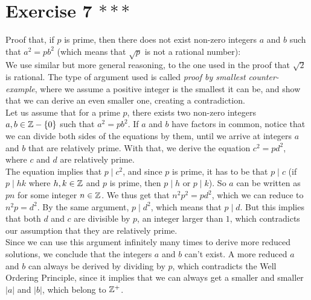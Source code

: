 \documentclass[12pt]{article}
\begin{document}
    \section*{Exercise 7  $***$}
    Proof that, if $p$ is prime, 
    then there does not exist non-zero integers $a$ and $b$
    such that $a^2 = pb^2$
    (which means that $\sqrt{p}$ is not a rational number): \\
    We use similar but more general reasoning,
    to the one used in the proof that $\sqrt{2}$ is rational.
    The type of argument used is called
    \textit{proof by smallest counter-example},
    where we assume a positive integer is the smallest it can be,
    and show that we can derive an even smaller one,
    creating a contradiction. \\
    Let us assume that for a prime $p$,
    there exists two non-zero integers $a, b \in \mathbb{Z} - \{0\}$ 
    such that $a^2 = pb^2$.
    If $a$ and $b$ have factors in common,
    notice that we can divide both sides of the equations by them,
    until we arrive at integers $a$ and $b$ that are relatively prime.
    With that, we derive the equation $c^2 = pd^2$,
    where $c$ and $d$ are relatively prime. \\
    The equation implies that $p \mid c^2$,
    and since $p$ is prime, 
    it has to be that $p \mid c$
    (if $p \mid hk$ where $h, k \in \mathbb{Z}$ and $p$ is prime,
    then $p \mid h$ or $p \mid k$).
    So $a$ can be written as $pn$ for some integer $n \in \mathbb{Z}$.
    We thus get that $n^2p^2 = pd^2$,
    which we can reduce to $n^2p = d^2$.
    By the same argument, $p \mid d^2$,
    which means that $p \mid d$.
    But this implies that both $d$ and $c$ are divisible by $p$,
    an integer larger than $1$,
    which contradicts our assumption that they are relatively prime. \\
    Since we can use this argument infinitely many times
    to derive more reduced solutions,
    we conclude that the integers $a$ and $b$ can't exist.
    A more reduced $a$ and $b$ can always be derived
    by dividing by $p$,
    which contradicts the Well Ordering Principle,
    since it implies that we can always get a smaller and smaller
    $|a|$ and $|b|$, which belong to $\mathbb{Z}^+$. \\
\end{document}
